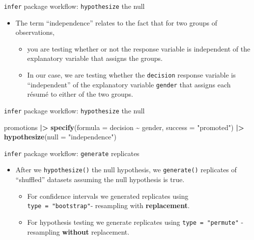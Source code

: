 \documentclass[
  ignorenonframetext,
]{beamer}
\newenvironment{Shaded}{\begin{snugshade}}{\end{snugshade}}
\newcommand{\AttributeTok}[1]{\textcolor[rgb]{0.13,0.29,0.53}{#1}}
\newcommand{\FunctionTok}[1]{\textcolor[rgb]{0.13,0.29,0.53}{\textbf{#1}}}
\newcommand{\NormalTok}[1]{#1}
\newcommand{\SpecialCharTok}[1]{\textcolor[rgb]{0.81,0.36,0.00}{\textbf{#1}}}
\newcommand{\StringTok}[1]{\textcolor[rgb]{0.31,0.60,0.02}{#1}}
\providecommand{\tightlist}{%
  \setlength{\itemsep}{0pt}\setlength{\parskip}{0pt}}
\begin{document}
\begin{frame}[fragile]{\texttt{infer} package workflow:
\texttt{hypothesize} the null}
\label{infer-package-workflow-hypothesize-the-null-2}
\begin{itemize}
\item
  The term ``independence'' relates to the fact that for two groups of
  observations,

  \begin{itemize}
  \tightlist
  \item
    you are testing whether or not the response variable is independent
    of the explanatory variable that assigns the groups.
  \item
    In our case, we are testing whether the \texttt{decision} response
    variable is ``independent'' of the explanatory variable
    \texttt{gender} that assigns each résumé to either of the two
    groups.
  \end{itemize}
\end{itemize}
\end{frame}

\begin{frame}[fragile]{\texttt{infer} package workflow:
\texttt{hypothesize} the null}
\label{infer-package-workflow-hypothesize-the-null-3}
\begin{Shaded}
\begin{Highlighting}[]
\NormalTok{promotions }\SpecialCharTok{|\textgreater{}} 
  \FunctionTok{specify}\NormalTok{(}\AttributeTok{formula =}\NormalTok{ decision }\SpecialCharTok{\textasciitilde{}}\NormalTok{ gender, }
          \AttributeTok{success =} \StringTok{"promoted"}\NormalTok{) }\SpecialCharTok{|\textgreater{}} 
  \FunctionTok{hypothesize}\NormalTok{(}\AttributeTok{null =} \StringTok{"independence"}\NormalTok{)}
\end{Highlighting}
\end{Shaded}
\end{frame}

\begin{frame}[fragile]{\texttt{infer} package workflow:
\texttt{generate} replicates}
\label{infer-package-workflow-generate-replicates}
\begin{itemize}
\item
  After we \texttt{hypothesize()} the null hypothesis, we
  \texttt{generate()} replicates of ``shuffled'' datasets assuming the
  null hypothesis is true.

  \begin{itemize}
  \item
    For confidence intervals we generated replicates using
    \texttt{type\ =\ "bootstrap"}- resampling with \textbf{replacement}.
  \item
    For hypothesis testing we generate replicates using
    \texttt{type\ =\ "permute"} - resampling \textbf{without}
    replacement.
  \end{itemize}
\end{itemize}
\end{frame}
\end{document}
